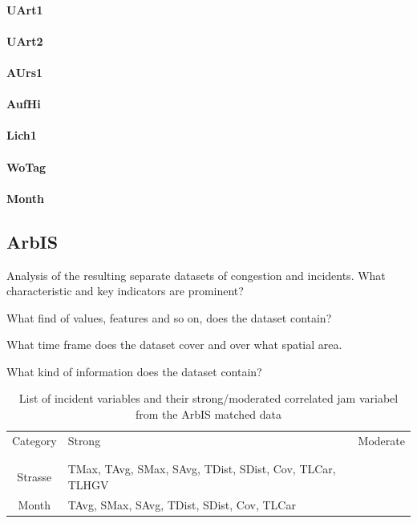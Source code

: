 \documentclass[a4paper,headsepline,footsepline,fontsize=11pt,BCOR=12mm,DIV=12]{report}
\begin{document}
\paragraph{UArt1}

\paragraph{UArt2}

\paragraph{AUrs1}

\paragraph{AufHi}

\paragraph{Lich1}

\paragraph{WoTag}

\paragraph{Month}

\subsection{ArbIS}

Analysis of the resulting separate datasets of congestion and incidents. What characteristic and key indicators are prominent?

What find of values, features and so on, does the dataset contain?

What time frame does the dataset cover and over what spatial area.

What kind of information does the dataset contain?

\noindent
\begin{table}[h!]
	\centering
	\begin{tabular}{c|l|l}  
		Category & Strong & Moderate \\
		\\[-1em]
		\hline
		\\[-1em]
		Strasse & TMax, TAvg, SMax, SAvg, TDist, SDist, Cov, TLCar, TLHGV & \\ 
 		Month & TAvg, SMax, SAvg, TDist, SDist, Cov, TLCar & \\
	\end{tabular}
	\caption{List of incident variables and their strong/moderated correlated jam variabel from the ArbIS matched data}
\end{table}
\end{document}

